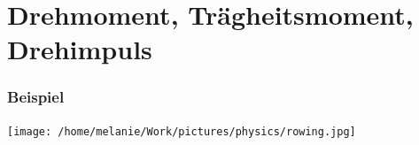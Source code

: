 \documentclass{beamer}
\begin{document}
\section{Drehmoment, Trägheitsmoment, Drehimpuls}



\begin{frame}
\end{frame}

\begin{frame}
\end{frame}
 
\begin{frame}
\frametitle{Beispiel}

\begin{center}
\texttt{[image: /home/melanie/Work/pictures/physics/rowing.jpg]}
\end{center}

\end{frame}
 
\end{document}
